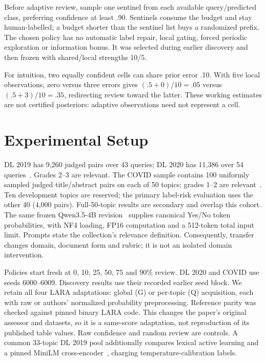 \documentclass[sigconf,nonacm]{acmart}
\begin{document}
Before adaptive review, sample one sentinel from each available query/predicted
class, preferring confidence at least .90. Sentinels consume the budget and stay
human-labelled; a budget shorter than the sentinel list buys a randomized prefix.
The chosen policy has no automatic label repair, local gating, forced periodic
exploration or information bonus. It was selected during earlier discovery and
then frozen with shared/local strengths 10/5.

For intuition, two equally confident cells can share prior error .10. With five
local observations, zero versus three errors gives $(.5+0)/10=.05$ versus
$(.5+3)/10=.35$, redirecting review toward the latter. These working estimates
are not certified posteriors: adaptive observations need not represent a cell.

\section{Experimental Setup}
DL 2019 has 9,260 judged pairs over 43 queries; DL 2020 has 11,386 over 54
queries~\cite{trec19,trec20}. Grades 2--3 are relevant. The COVID sample contains
100 uniformly sampled judged title/abstract pairs on each of 50 topics;
grades 1--2 are relevant~\cite{treccovid}. Ten development topics are reserved;
the primary label-risk evaluation uses the other 40 (4,000 pairs). Full-50-topic
results are secondary and overlap this cohort. The same frozen Qwen3.5-4B
revision~\cite{qwen} supplies canonical Yes/No token probabilities, with NF4
loading, FP16 computation and a 512-token total input limit. Prompts state the
collection's relevance definition. Consequently, transfer changes domain,
document form and rubric; it is not an isolated domain intervention.

Policies start fresh at 0, 10, 25, 50, 75 and 90\% review. DL 2020 and COVID use
seeds 6000--6009. Discovery results use their recorded earlier seed block.
We retain all four LARA adaptations: global (G) or per-topic (Q) acquisition,
each with raw or authors' normalized probability preprocessing. Reference parity
was checked against pinned binary LARA code. This changes the paper's original
assessor and datasets, so it is a same-score adaptation, not reproduction of its
published table values. Raw confidence and random review are controls. A common
33-topic DL 2019 pool additionally compares lexical active learning and a pinned
MiniLM cross-encoder~\cite{minilm}, charging temperature-calibration labels.

\begin{table}[t]
\centering\small
\caption{At 50\% human review, lower is better; best means are bold.
All values are percentages.
DL19 is discovery. COVID uses the 40 reserved topics. $E_Q$ divides each query's
remaining mistakes by all its pairs; $R$ divides pooled mistakes by automatic
pairs. G/Q denote global/topic LARA. Every budget includes online calibration.}
\label{tab:main}
\end{table}
\end{document}
